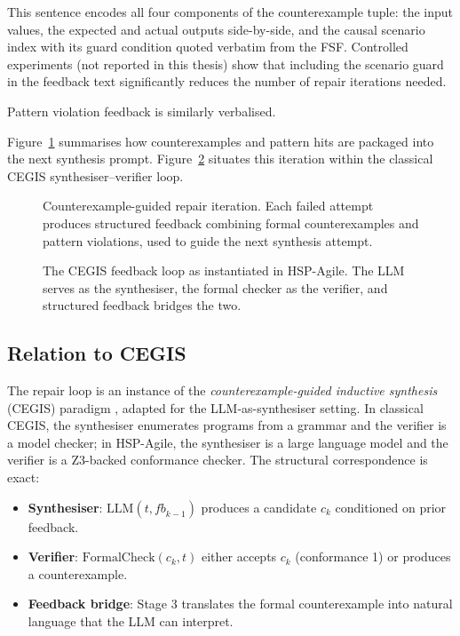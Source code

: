 This sentence encodes all four components of the counterexample tuple:
the input values, the expected and actual outputs side-by-side, and the
causal scenario index with its guard condition quoted verbatim from the FSF.
Controlled experiments (not reported in this thesis) show that including the
scenario guard in the feedback text significantly reduces the number of
repair iterations needed.

Pattern violation feedback is similarly verbalised.

Figure~\ref{fig:repair-feedback} summarises how counterexamples and pattern
hits are packaged into the next synthesis prompt.
Figure~\ref{fig:cegis-loop} situates this iteration within the classical
CEGIS synthesiser--verifier loop.

\begin{figure}[t]
  \centering
  \caption{Counterexample-guided repair iteration.  Each failed attempt
           produces structured feedback combining formal counterexamples
           and pattern violations, used to guide the next synthesis
           attempt.}
  \label{fig:repair-feedback}
\end{figure}

\begin{figure}[t]
  \centering
  \caption{The CEGIS feedback loop as instantiated in HSP-Agile.  The LLM
           serves as the synthesiser, the formal checker as the verifier,
           and structured feedback bridges the two.}
  \label{fig:cegis-loop}
\end{figure}

\subsection{Relation to CEGIS}
\label{subsec:method:cegis}

The repair loop is an instance of the \emph{counterexample-guided inductive
synthesis} (CEGIS) paradigm \citep{solarlezama2008sketching}, adapted for the
LLM-as-synthesiser setting.  In classical CEGIS, the synthesiser enumerates
programs from a grammar and the verifier is a model checker; in HSP-Agile,
the synthesiser is a large language model and the verifier is a Z3-backed
conformance checker.  The structural correspondence is exact:
\begin{itemize}
  \item \textbf{Synthesiser}: $\mathrm{LLM}(t, \mathit{fb}_{k-1})$
        produces a candidate $c_k$ conditioned on prior feedback.
  \item \textbf{Verifier}: $\mathrm{FormalCheck}(c_k, t)$ either accepts
        $c_k$ (conformance 1) or produces a counterexample.
  \item \textbf{Feedback bridge}: Stage 3 translates the formal
        counterexample into natural language that the LLM can interpret.
\end{itemize}

